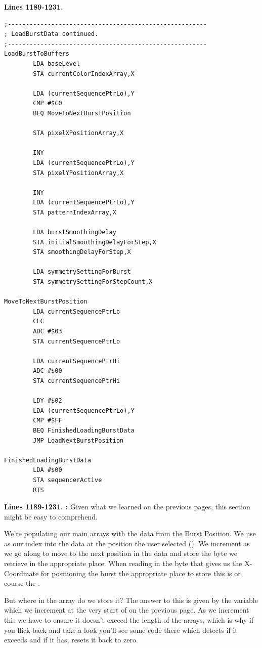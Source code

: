 \clearpage
\textbf{Lines 1189-1231. }
\begin{lstlisting}
;-------------------------------------------------------
; LoadBurstData continued.
;-------------------------------------------------------
LoadBurstToBuffers
        LDA baseLevel
        STA currentColorIndexArray,X

        LDA (currentSequencePtrLo),Y
        CMP #$C0
        BEQ MoveToNextBurstPosition

        STA pixelXPositionArray,X

        INY 
        LDA (currentSequencePtrLo),Y
        STA pixelYPositionArray,X

        INY 
        LDA (currentSequencePtrLo),Y
        STA patternIndexArray,X

        LDA burstSmoothingDelay
        STA initialSmoothingDelayForStep,X
        STA smoothingDelayForStep,X

        LDA symmetrySettingForBurst
        STA symmetrySettingForStepCount,X

MoveToNextBurstPosition
        LDA currentSequencePtrLo
        CLC 
        ADC #$03
        STA currentSequencePtrLo

        LDA currentSequencePtrHi
        ADC #$00
        STA currentSequencePtrHi

        LDY #$02
        LDA (currentSequencePtrLo),Y
        CMP #$FF
        BEQ FinishedLoadingBurstData
        JMP LoadNextBurstPosition

FinishedLoadingBurstData
        LDA #$00
        STA sequencerActive
        RTS 
\end{lstlisting}
\clearpage

\textbf{Lines 1189-1231. :}  Given what we learned on the previous pages, this section might be easy to comprehend.

We're populating our main arrays with the data from the Burst Position. We use  as our index into the data at the position the user selected ().
We increment  as we go along to move to the next position in the data and store the byte we retrieve in the appropriate place. When reading in the byte
that gives us the X-Coordinate for positioning the burst the appropriate place to store this is of course the .

 But where in the array 
do we store it? The answer to this is given by the variable  which we increment at the very start of  on the 
previous page. As we increment this we have to ensure it doesn't exceed the length of the arrays, which is why if you flick back and take a look you'll see some
code there which detects if it exceeds  and if it has, resets it back to zero.

